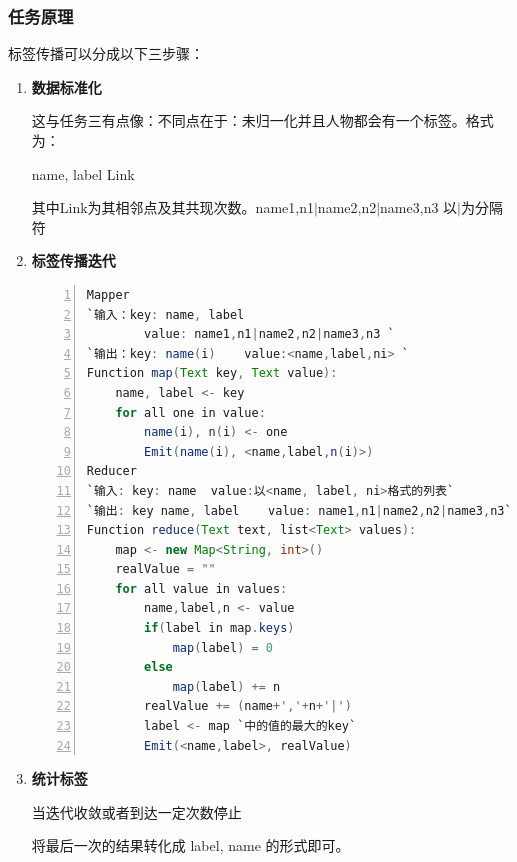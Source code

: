 \documentclass{ctexart}
\begin{document}
	\subsubsection{任务原理}
	\par 标签传播可以分成以下三步骤：
	\begin{enumerate}[I]
		\item \textbf{数据标准化}
		\par 这与任务三有点像：不同点在于：未归一化并且人物都会有一个标签。格式为：
		\par name, label Link
		\par 其中Link为其相邻点及其共现次数。name1,n1$\left|\text{}\right.$name2,n2$\left|\text{}\right.$name3,n3 以$\left|\text{}\right.$为分隔符
		\item \textbf{标签传播迭代}
		\begin{lstlisting}[language=java, numbers=left, numberstyle=\tiny, frame=shadowbox, basicstyle=\ttfamily, escapeinside=``]	
Mapper
`输入：key: name, label	
		value: name1,n1|name2,n2|name3,n3 `
`输出：key: name(i)	value:<name,label,ni> `
Function map(Text key, Text value):
	name, label <- key		
	for all one in value:
		name(i), n(i) <- one
		Emit(name(i), <name,label,n(i)>)
Reducer
`输入: key: name	value:以<name, label, ni>格式的列表`
`输出: key name, label	value: name1,n1|name2,n2|name3,n3`
Function reduce(Text text, list<Text> values):
	map <- new Map<String, int>()
	realValue = ""
	for all value in values:
		name,label,n <- value
		if(label in map.keys)
			map(label) = 0
		else
			map(label) += n
		realValue += (name+','+n+'|')
		label <- map `中的值的最大的key`
		Emit(<name,label>, realValue)

		\end{lstlisting}
		\item \textbf{统计标签}
		\par 当迭代收敛或者到达一定次数停止
		\par 将最后一次的结果转化成 label, name 的形式即可。
		
	\end{enumerate}
\end{document}
